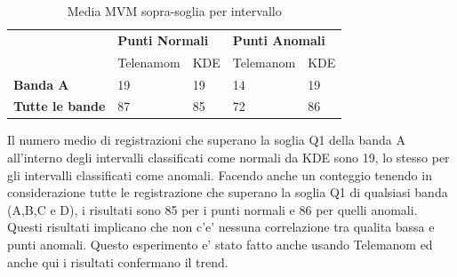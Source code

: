 \begin{table}[]
\centering
\begin{tabular}{|l|ll|ll|}
\hline
\multirow{2}{*}{}       & \multicolumn{2}{l|}{\textbf{Punti Normali}} & \multicolumn{2}{l|}{\textbf{Punti Anomali}} \\ \cline{2-5} 
                        & \multicolumn{1}{l|}{Telenamom}     & KDE    & \multicolumn{1}{l|}{Telemanom}     & KDE    \\ \hline
\textbf{Banda A}        & \multicolumn{1}{l|}{19}            & 19     & \multicolumn{1}{l|}{14}            & 19     \\ \hline
\textbf{Tutte le bande} & \multicolumn{1}{l|}{87}            & 85     & \multicolumn{1}{l|}{72}            & 86     \\ \hline
\end{tabular}
 \caption{\label{quality_count}Media MVM sopra-soglia per intervallo}
\end{table}

Il numero medio di registrazioni che superano la soglia Q1 della banda A all'interno degli intervalli classificati come normali da KDE sono 19, lo stesso per gli intervalli classificati come anomali. Facendo anche un conteggio tenendo in considerazione tutte le registrazione che superano la soglia Q1 di qualsiasi banda (A,B,C e D), i risultati sono 85 per i punti normali e 86 per quelli anomali. Questi risultati implicano che non c'e' nessuna correlazione tra qualita bassa e punti anomali. 
Questo esperimento e' stato fatto anche usando Telemanom ed anche qui i risultati confermano il trend.

